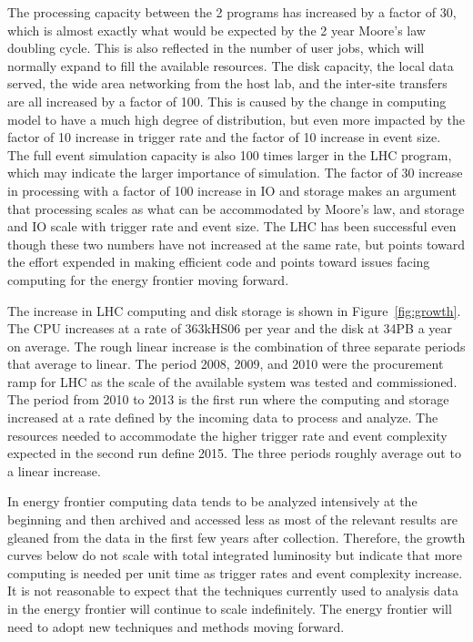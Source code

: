 The processing capacity between the 2 programs has increased by a factor of 30, which is almost exactly what 
would be expected by the 2 year Moore's law doubling cycle.    This is also reflected in the number of user 
jobs, which will normally expand to fill the available resources.     The disk capacity, the local data 
served, the wide area networking from the host lab, and the inter-site transfers are all increased by a 
factor of 100.   This is caused by the change in computing model to have a much high degree of 
distribution, but even more impacted by the factor of 10 increase in trigger rate and the factor 
of 10 increase in event size.   The full event simulation capacity is also 100 times larger in the 
LHC program, which may indicate the larger importance of simulation.   The factor of 30 increase in 
processing with a factor of 100 increase in IO and storage makes an argument that processing scales as what can be accommodated by Moore's law, and storage and IO scale with trigger rate and event size.   The LHC has been successful even though these two numbers have not increased at the same rate, but points toward the effort expended in making efficient code and points toward issues facing computing for the energy frontier moving forward.

The increase in LHC computing and disk storage is shown in Figure~\ref{fig:growth}.    The CPU increases at a rate of 363kHS06 per year and the disk at 34PB a year on average.   The rough linear increase is the combination of three separate periods that average to linear.   The period 2008, 2009, and 2010 were the procurement ramp for LHC as the scale of the available system was tested and commissioned.   The period from  2010 to 2013 is the first run where the computing and storage increased at a rate defined by the incoming data to process and analyze.    The resources needed to accommodate the higher trigger rate and event complexity expected in the second run define 2015.  The three periods roughly average out to a linear increase.    

In energy frontier computing data tends to be analyzed intensively at the beginning and then archived and accessed less as most of the relevant results are gleaned from the data in the first few years after collection.   Therefore, the growth curves below do not scale with total integrated luminosity but indicate that more computing is needed per unit time as trigger rates and event complexity increase.    It is not reasonable to expect that the techniques currently used to analysis data in the energy frontier will continue to scale indefinitely.   The energy frontier will need to adopt new techniques and methods moving forward.

